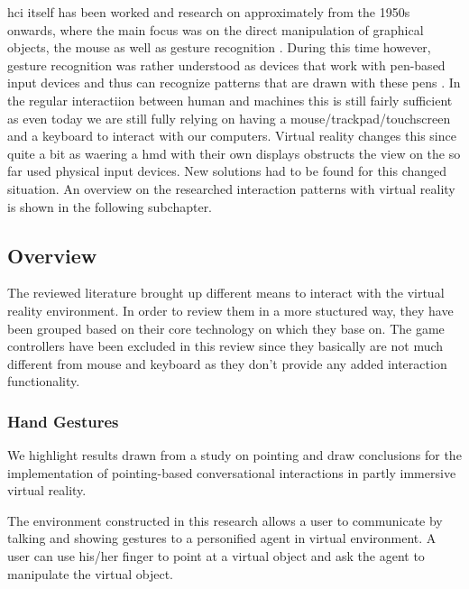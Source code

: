 \gls{hci} itself has been worked and research on approximately from the 1950s onwards, where the main focus was on the direct manipulation of graphical objects, the mouse as well as gesture recognition \citep{Myers1998}. During this time however, gesture recognition was rather understood as devices that work with pen-based input devices and thus can recognize patterns that are drawn with these pens \citep{Myers1998}. In the regular interactiion between human and machines this is still fairly sufficient as even today we are still fully relying on having a mouse/trackpad/touchscreen and a keyboard to interact with our computers. \newline
Virtual reality changes this since quite a bit as waering a \gls{hmd} with their own displays obstructs the view on the so far used physical input devices. New solutions had to be found for this changed situation. An overview on the researched interaction patterns with virtual reality is shown in the following subchapter.



\subsection{Overview}

The reviewed literature brought up different means to interact with the virtual reality environment. In order to review them in a more stuctured way, they have been grouped based on their core technology on which they base on. The game controllers have been excluded in this review since they basically are not much different from mouse and keyboard as they don't provide any added interaction functionality.

\subsubsection{Hand Gestures}

We highlight results drawn from a study on pointing and draw conclusions for the implementation of pointing-based conversational interactions in partly immersive virtual reality.
\cite{Pfeiffer2008}

The environment constructed in this research allows a user to communicate by talking and showing gestures
to a personified agent in virtual environment. A user can use his/her finger to point at a virtual object and ask the agent to manipulate the virtual object.
\cite{Uchino2008}

